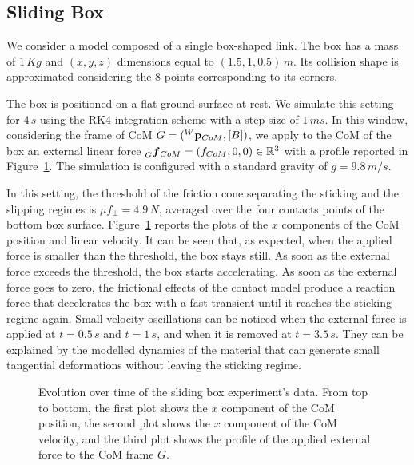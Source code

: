 \subsection{Sliding Box}

We consider a model composed of a single box-shaped link.
The box has a mass of $1 \, Kg$ and $(x, y, z)$ dimensions equal to $(1.5, 1, 0.5) \, m$.
Its collision shape is approximated considering the 8 points corresponding to its corners.

The box is positioned on a flat ground surface at rest.
We simulate this setting for $4 \, s$ using the \ac{RK4} integration scheme with a step size of $1 \, ms$.
In this window, considering the frame of \ac{CoM} $G = (\pos[W]_{CoM}, [B])$, we apply to the \ac{CoM} of the box an external linear force $\forcelin[G]_{CoM} = (f_{CoM}, 0, 0) \in \realn^3$ with a profile reported in Figure~\ref{fig:sliding_box}.
The simulation is configured with a standard gravity of $g = 9.8 \, m/s$.

In this setting, the threshold of the friction cone separating the sticking and the slipping regimes is $\mu f_\perp = 4.9 \, N$, averaged over the four contacts points of the bottom box surface.
Figure~\ref{fig:sliding_box} reports the plots of the $x$ components of the \ac{CoM} position and linear velocity.
It can be seen that, as expected, when the applied force is smaller than the threshold, the box stays still.
As soon as the external force exceeds the threshold, the box starts accelerating.
As soon as the external force goes to zero, the frictional effects of the contact model produce a reaction force that decelerates the box with a fast transient until it reaches the sticking regime again.
Small velocity oscillations can be noticed when the external force is applied at $t=0.5 \, s$ and $t=1 \, s$, and when it is removed at $t=3.5 \, s$.
They can be explained by the modelled dynamics of the material that can generate small tangential deformations without leaving the sticking regime.

\begin{figure}
    \centering
    \caption{Evolution over time of the sliding box experiment's data. From top to bottom, the first plot shows the $x$ component of the \ac{CoM} position, the second plot shows the $x$ component of the \ac{CoM} velocity, and the third plot shows the profile of the applied external force to the \ac{CoM} frame $G$.}
    \label{fig:sliding_box}
\end{figure}

